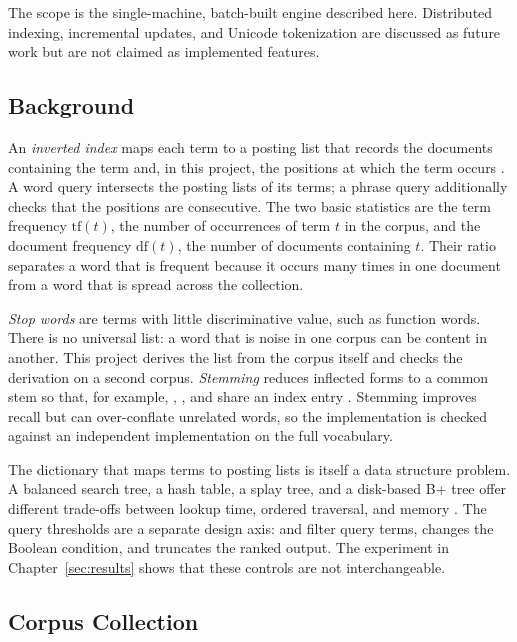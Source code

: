 The scope is the single-machine, batch-built engine described here. Distributed
indexing, incremental updates, and Unicode tokenization are discussed as
future work but are not claimed as implemented features.

\subsection{Background}
\label{sec:background}

An \emph{inverted index} maps each term to a posting list that records the
documents containing the term and, in this project, the positions at which the
term occurs \cite{manning2008}. A word query intersects the posting lists of
its terms; a phrase query additionally checks that the positions are
consecutive. The two basic statistics are the term frequency $\mathrm{tf}(t)$,
the number of occurrences of term $t$ in the corpus, and the document frequency
$\mathrm{df}(t)$, the number of documents containing $t$. Their ratio separates
a word that is frequent because it occurs many times in one document from a
word that is spread across the collection.

\emph{Stop words} are terms with little discriminative value, such as function
words. There is no universal list: a word that is noise in one corpus can be
content in another. This project derives the list from the corpus itself and
checks the derivation on a second corpus. \emph{Stemming} reduces inflected
forms to a common stem so that, for example, , , and
 share an index entry \cite{porter1980}. Stemming improves
recall but can over-conflate unrelated words, so the implementation is checked
against an independent implementation on the full vocabulary.

The dictionary that maps terms to posting lists is itself a data structure
problem. A balanced search tree, a hash table, a splay tree, and a disk-based
B+ tree offer different trade-offs between lookup time, ordered traversal, and
memory \cite{cormen2022}. The query thresholds are a separate design axis:
 and  filter query terms,  changes the
Boolean condition, and  truncates the ranked output. The experiment
in Chapter~\ref{sec:results} shows that these controls are not interchangeable.

\subsection{Corpus Collection}


